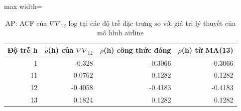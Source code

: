 \begin{table}[H]
\centering\small
\caption{AP: ACF của $\nabla\nabla_{12}$ log tại các độ trễ đặc trưng so với giá trị lý thuyết của mô hình airline}\label{tab:tab_b12_10_airline_acf}
\begin{adjustbox}{max width=\linewidth}
\begin{tabular}{rrrr}
\toprule
Độ trễ h & $\hat{\rho}$(h) của $\nabla\nabla_{12}$ & $\rho$(h) công thức đóng & $\rho$(h) từ MA(13) \\
\midrule
1 & -0.328 & -0.3066 & -0.3066 \\
11 & 0.0762 & 0.1282 & 0.1282 \\
12 & -0.4058 & -0.4183 & -0.4183 \\
13 & 0.1824 & 0.1282 & 0.1282 \\
\bottomrule
\end{tabular}
\end{adjustbox}
\end{table}

